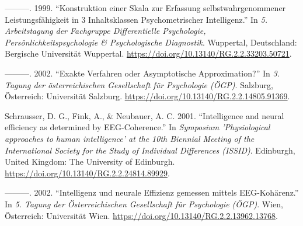 \documentclass[
]{article}
\newlength{\cslhangindent}
\newlength{\cslentryspacingunit} %
\newenvironment{CSLReferences}[2] %
 {%
  \setlength{\parindent}{0pt}
  \ifodd #1
  \let\oldpar\par
  \def\par{\hangindent=\cslhangindent\oldpar}
  \fi
  \setlength{\parskip}{#2\cslentryspacingunit}
 }%
 {}
\begin{document}
\begin{CSLReferences}{1}{0}
\leavevmode{}%
---------. 1999. {``{Konstruktion einer Skala zur Erfassung
selbstwahrgenommener Leistungsfähigkeit in 3 Inhaltsklassen
Psychometrischer Intelligenz}.''} In \emph{{5. Arbeitstagung der
Fachgruppe Differentielle Psychologie, Persönlichkeitspsychologie \&
Psychologische Diagnostik}}. Wuppertal, Deutschland: {Bergische
Universität Wuppertal}.
\url{https://doi.org/10.13140/RG.2.2.33203.50721}.

\leavevmode{}%
---------. 2002. {``{Exakte Verfahren oder Asymptotische
Approximation?}''} In \emph{{3. Tagung der österreichischen Gesellschaft
für Psychologie (ÖGP)}}. Salzburg, Österreich: {Universität Salzburg}.
\url{https://doi.org/10.13140/RG.2.2.14805.91369}.

\leavevmode{}%
Schrausser, D. G., Fink, A., \& Neubauer, A. C. 2001. {``{Intelligence
and neural efficiency as determined by EEG-Coherence}.''} In
\emph{{Symposium 'Physiological approaches to human intelligence' at the
10th Biennial Meeting of the International Society for the Study of
Individual Differences (ISSID)}}. Edinburgh, United Kingdom: {The
University of Edinburgh}.
\url{https://doi.org/10.13140/RG.2.2.24814.89929}.

\leavevmode{}%
---------. 2002. {``{Intelligenz und neurale Effizienz gemessen mittels
EEG-Kohärenz}.''} In \emph{{5. Tagung der Österreichischen Gesellschaft
für Psychologie (ÖGP)}}. Wien, Österreich: {Universität Wien}.
\url{https://doi.org/10.13140/RG.2.2.13962.13768}.

\end{CSLReferences}
\end{document}
